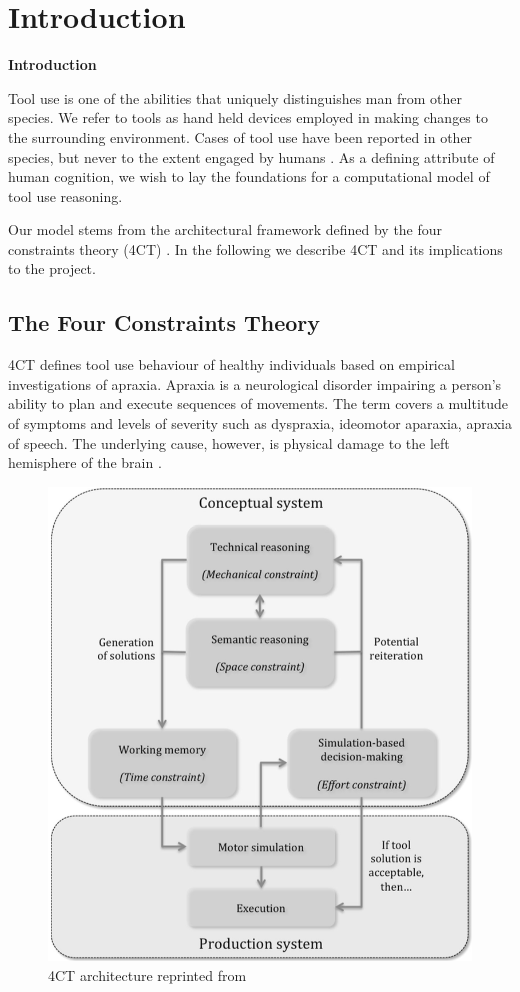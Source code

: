 \documentclass[11]{article}
\let \shorttitle \textbf
\let \citeA \textcite
\begin{document}
\section{Introduction}

\shorttitle{Introduction}

Tool use is one of the abilities that uniquely distinguishes man from other species. 
We refer to tools as hand held devices employed in making changes to the surrounding environment. 
Cases of tool use have been reported in other species, but never to the extent engaged by humans \cite{boysen1999,harrington2009,lefebvre2004}. 
As a defining attribute of human cognition, we wish to lay the foundations for a computational model of tool use reasoning.

Our model stems from the architectural framework defined by the four constraints theory (4CT) \cite{osiurak2014a}.
In the following we describe 4CT and its implications to the project.  

\subsection{The Four Constraints Theory}
4CT defines tool use behaviour of healthy individuals based on empirical investigations of apraxia.
Apraxia is a neurological disorder impairing a person's ability to plan and execute sequences of movements.
The term covers a multitude of symptoms and levels of severity such as dyspraxia, ideomotor aparaxia, apraxia of speech.
The underlying cause, however, is physical damage to the left hemisphere of the brain \cite{osiurak2013}.

\begin{figure}[h]
  \centering
  \includegraphics[width=.9\textwidth]{figures/4CTArchitecture.png}
  \caption{4CT architecture reprinted from \citeA{osiurak2014a}}
  \label{fig:4CTArchitecture}
\end{figure}      
\end{document}
